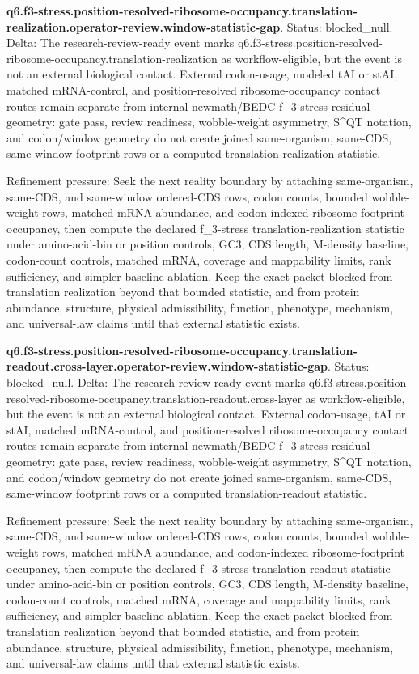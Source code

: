 \textbf{q6.f3-stress.position-resolved-ribosome-occupancy.translation-realization.operator-review.window-statistic-gap}. Status: blocked\_null. Delta: The research-review-ready event marks q6.f3-stress.position-resolved-ribosome-occupancy.translation-realization as workflow-eligible, but the event is not an external biological contact. External codon-usage, modeled tAI or stAI, matched mRNA-control, and position-resolved ribosome-occupancy contact routes remain separate from internal newmath/BEDC f\_3-stress residual geometry: gate pass, review readiness, wobble-weight asymmetry, S\textasciicircum{}QT notation, and codon/window geometry do not create joined same-organism, same-CDS, same-window footprint rows or a computed translation-realization statistic.

Refinement pressure: Seek the next reality boundary by attaching same-organism, same-CDS, and same-window ordered-CDS rows, codon counts, bounded wobble-weight rows, matched mRNA abundance, and codon-indexed ribosome-footprint occupancy, then compute the declared f\_3-stress translation-realization statistic under amino-acid-bin or position controls, GC3, CDS length, M-density baseline, codon-count controls, matched mRNA, coverage and mappability limits, rank sufficiency, and simpler-baseline ablation. Keep the exact packet blocked from translation realization beyond that bounded statistic, and from protein abundance, structure, physical admissibility, function, phenotype, mechanism, and universal-law claims until that external statistic exists.

\textbf{q6.f3-stress.position-resolved-ribosome-occupancy.translation-readout.cross-layer.operator-review.window-statistic-gap}. Status: blocked\_null. Delta: The research-review-ready event marks q6.f3-stress.position-resolved-ribosome-occupancy.translation-readout.cross-layer as workflow-eligible, but the event is not an external biological contact. External codon-usage, tAI or stAI, matched mRNA-control, and position-resolved ribosome-occupancy contact routes remain separate from internal newmath/BEDC f\_3-stress residual geometry: gate pass, review readiness, wobble-weight asymmetry, S\textasciicircum{}QT notation, and codon/window geometry do not create joined same-organism, same-CDS, same-window footprint rows or a computed translation-readout statistic.

Refinement pressure: Seek the next reality boundary by attaching same-organism, same-CDS, and same-window ordered-CDS rows, codon counts, bounded wobble-weight rows, matched mRNA abundance, and codon-indexed ribosome-footprint occupancy, then compute the declared f\_3-stress translation-readout statistic under amino-acid-bin or position controls, GC3, CDS length, M-density baseline, codon-count controls, matched mRNA, coverage and mappability limits, rank sufficiency, and simpler-baseline ablation. Keep the exact packet blocked from translation realization beyond that bounded statistic, and from protein abundance, structure, physical admissibility, function, phenotype, mechanism, and universal-law claims until that external statistic exists.

